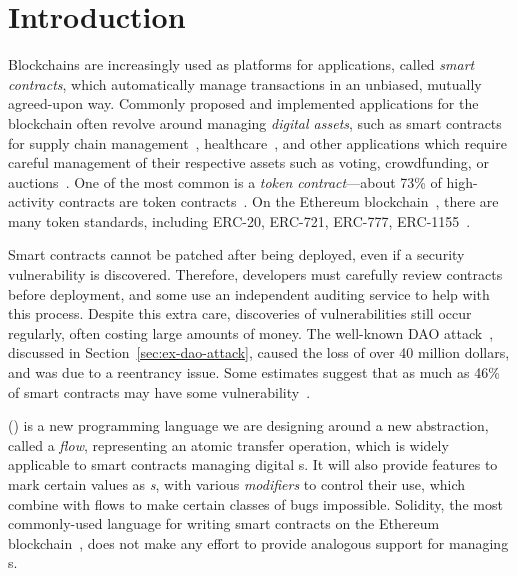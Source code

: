 \documentclass[dvipsnames, usenames, sigconf]{acmart}
\begin{document}

\maketitle

\section{Introduction}

Blockchains are increasingly used as platforms for applications, called \emph{smart contracts}, which automatically manage transactions in an unbiased, mutually agreed-upon way.
Commonly proposed and implemented applications for the blockchain often revolve around managing \emph{digital assets}, such as smart contracts for supply chain management~\cite{SupplyChainUse}, healthcare~\cite{HealthcareUse}, and other applications which require careful management of their respective assets such as voting, crowdfunding, or auctions~\cite{Elsden18:Making}.
One of the most common is a \emph{token contract}---about 73\% of high-activity contracts are token contracts~\cite{OlivaEtAl2019}.
On the Ethereum blockchain~\cite{wood2014ethereum}, there are many token standards, including ERC-20, ERC-721, ERC-777, ERC-1155~\cite{erc20,erc721,erc777,erc1155}.

Smart contracts cannot be patched after being deployed, even if a security vulnerability is discovered.
Therefore, developers must carefully review contracts before deployment, and some use an independent auditing service to help with this process.
Despite this extra care, discoveries of vulnerabilities still occur regularly, often costing large amounts of money.
The well-known DAO attack~\cite{DAO}, discussed in Section~\ref{sec:ex-dao-attack}, caused the loss of over 40 million dollars, and was due to a reentrancy issue.
Some estimates suggest that as much as 46\% of smart contracts may have some vulnerability~\cite{luuOyente}.

\langName (\langNamePronounce) is a new programming language we are designing around a new abstraction, called a \emph{flow}, representing an atomic transfer operation, which is widely applicable to smart contracts managing digital \assetTxt{}s.
It will also provide features to mark certain values as \emph{\assetTxt{}s}, with various \emph{modifiers} to control their use, which combine with flows to make certain classes of bugs impossible.
Solidity, the most commonly-used language for writing smart contracts on the Ethereum blockchain~\cite{EthereumForDevs}, does not make any effort to provide analogous support for managing \assetTxt{}s.
\end{document}
